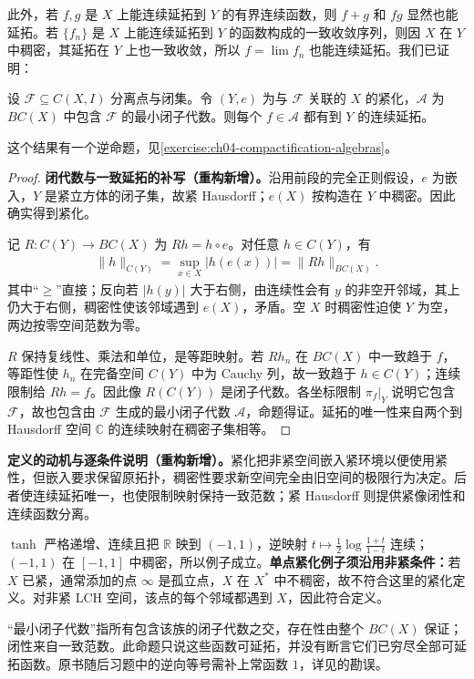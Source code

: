 \documentclass[../../main.tex]{subfiles}
\begin{document}
此外，若 $f,g$ 是 $X$ 上能连续延拓到 $Y$ 的有界连续函数，则 $f+g$ 和 $fg$ 显然也能延拓。若 $\{f_n\}$ 是 $X$ 上能连续延拓到 $Y$ 的函数构成的一致收敛序列，则因 $X$ 在 $Y$ 中稠密，其延拓在 $Y$ 上也一致收敛，所以 $f=\lim f_n$ 也能连续延拓。我们已证明：
\begin{proposition}\label{proposition:ch04-extension-generated-algebra}
设 $\mathcal F\subseteq C(X,I)$ 分离点与闭集。令 $(Y,e)$ 为与 $\mathcal F$ 关联的 $X$ 的紧化，$\mathcal A$ 为 $BC(X)$ 中包含 $\mathcal F$ 的最小闭子代数。则每个 $f\in\mathcal A$ 都有到 $Y$ 的连续延拓。
\end{proposition}
这个结果有一个逆命题，见\cref{exercise:ch04-compactification-algebras}。
\begin{proof}
\textbf{闭代数与一致延拓的补写（重构新增）。}沿用前段的完全正则假设，$e$ 为嵌入，$Y$ 是紧立方体的闭子集，故紧 Hausdorff；$e(X)$ 按构造在 $Y$ 中稠密。因此确实得到紧化。

记 $R:C(Y)\to BC(X)$ 为 $Rh=h\circ e$。对任意 $h\in C(Y)$，有
\begin{align*}
\|h\|_{C(Y)}=\sup_{x\in X}|h(e(x))|=\|Rh\|_{BC(X)}.
\end{align*}
其中“$\ge$”直接；反向若 $|h(y)|$ 大于右侧，由连续性会有 $y$ 的非空开邻域，其上仍大于右侧，稠密性使该邻域遇到 $e(X)$，矛盾。空 $X$ 时稠密性迫使 $Y$ 为空，两边按零空间范数为零。

$R$ 保持复线性、乘法和单位，是等距映射。若 $Rh_n$ 在 $BC(X)$ 中一致趋于 $f$，等距性使 $h_n$ 在完备空间 $C(Y)$ 中为 Cauchy 列，故一致趋于 $h\in C(Y)$；连续限制给 $Rh=f$。因此像 $R(C(Y))$ 是闭子代数。各坐标限制 $\pi_f|_Y$ 说明它包含 $\mathcal F$，故也包含由 $\mathcal F$ 生成的最小闭子代数 $\mathcal A$，命题得证。延拓的唯一性来自两个到 Hausdorff 空间 $\mathbb C$ 的连续映射在稠密子集相等。
\end{proof}
\begin{remark}
\textbf{定义的动机与逐条件说明（重构新增）。}紧化把非紧空间嵌入紧环境以便使用紧性，但嵌入要求保留原拓扑，稠密性要求新空间完全由旧空间的极限行为决定。后者使连续延拓唯一，也使限制映射保持一致范数；紧 Hausdorff 则提供紧像闭性和连续函数分离。

$\tanh$ 严格递增、连续且把 $\mathbb R$ 映到 $(-1,1)$，逆映射 $t\mapsto\frac12\log\frac{1+t}{1-t}$ 连续；$(-1,1)$ 在 $[-1,1]$ 中稠密，所以例子成立。\textbf{单点紧化例子须沿用非紧条件：}若 $X$ 已紧，通常添加的点 $\infty$ 是孤立点，$X$ 在 $X^*$ 中不稠密，故不符合这里的紧化定义。对非紧 LCH 空间，该点的每个邻域都遇到 $X$，因此符合定义。

“最小闭子代数”指所有包含该族的闭子代数之交，存在性由整个 $BC(X)$ 保证；闭性来自一致范数。此命题只说这些函数可延拓，并没有断言它们已穷尽全部可延拓函数。原书随后习题中的逆向等号需补上常函数 $1$，详见的勘误。
\end{remark}
\end{document}
